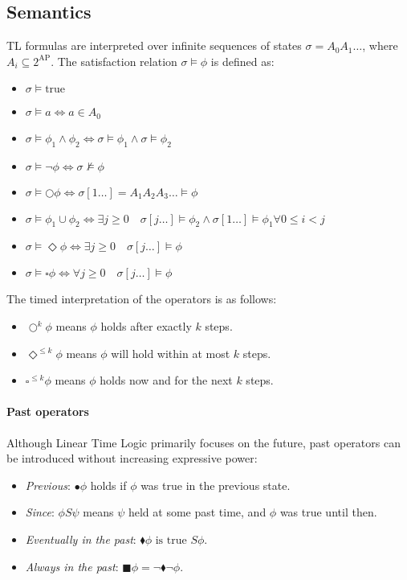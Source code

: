 \subsection{Semantics}
TL formulas are interpreted over infinite sequences of states $\sigma=A_0A_1\dots$, where $A_i \subseteq 2^{\text{AP}}$.
The satisfaction relation $\sigma\models\phi$ is defined as:
\begin{itemize}
    \item $\sigma\models\text{true}$
    \item $\sigma\models a \Leftrightarrow a\in A_0$
    \item $\sigma\models \phi_1\land\phi_2 \Leftrightarrow \sigma\models\phi_1 \land \sigma\models\phi_2$
    \item $\sigma\models \lnot\phi \Leftrightarrow \sigma\not\models\phi$
    \item $\sigma\models \bigcirc \phi \Leftrightarrow \sigma[1\dots]=A_1A_2A_3\dots\models\phi$
    \item $\sigma\models \phi_1\cup\phi_2 \Leftrightarrow \exists j \geq 0\quad\sigma[j\dots]\models\phi_2 \land \sigma[1\dots]\models\phi_1\forall 0\leq i<j$
    \item $\sigma\models\Diamond\phi \Leftrightarrow \exists j\geq 0 \quad \sigma[j\dots]\models\phi$
    \item $\sigma\models\square\phi \Leftrightarrow \forall j\geq 0 \quad \sigma[j\dots]\models\phi$
\end{itemize}
\noindent The timed interpretation of the operators is as follows: 
\begin{itemize}
    \item $\bigcirc^k\phi$ means $\phi$ holds after exactly $k$ steps. 
    \item $\Diamond^{\leq k}\phi$ means $\phi$ will hold within at most $k$ steps. 
    \item $\square^{\leq k}\phi$ means $\phi$ holds now and for the next $k$ steps.
\end{itemize}

\paragraph*{Past operators}
Although Linear Time Logic primarily focuses on the future, past operators can be introduced without increasing expressive power:
\begin{itemize}
    \item \textit{Previous}: $\bullet\phi$ holds if $\phi$ was true in the previous state.
    \item \textit{Since}: $\phi S \psi$ means $\psi$ held at some past time, and $\phi$ was true until then.
    \item \textit{Eventually in the past}: $\blacklozenge \phi\text{ is true }S\phi$.
    \item \textit{Always in the past}: $\blacksquare \phi=\lnot\blacklozenge \lnot\phi$.
\end{itemize}

